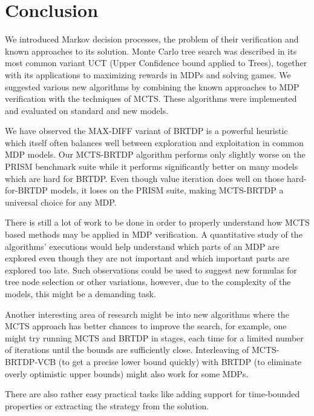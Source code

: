 \chapter{Conclusion}

We introduced Markov decision processes,
the problem of their verification and known approaches to its solution.
Monte Carlo tree search was described in its most common variant UCT
(Upper Confidence bound applied to Trees),
together with its applications to maximizing rewards in MDPs and solving
games.
We suggested various new algorithms by combining the known
approaches to MDP verification with the techniques of MCTS. These
algorithms were implemented and evaluated on standard and new models.

We have observed the MAX-DIFF variant of BRTDP is a powerful
heuristic which itself often balances well between exploration and
exploitation in common MDP models.
Our MCTS-BRTDP algorithm performs only slightly worse on the PRISM
benchmark suite while it performs significantly better on many models
which are hard for BRTDP.  Even though value iteration does well on
those hard-for-BRTDP models, it loses on the PRISM suite, making
MCTS-BRTDP a universal choice for any MDP.

There is still a lot of work to be done in order to properly understand
how MCTS based methods may be applied in MDP verification. A
quantitative study of the algorithms' executions would help understand
which parts
of an MDP are explored even though they are not important and which
important parts are explored too late. Such observations could be used
to suggest new formulas for tree node selection or other variations,
however, due to the complexity of the models, this might be a demanding task.

Another interesting area of research might be into
new algorithms where the MCTS approach has better chances to
improve the search, for example, one might try running MCTS and BRTDP in
stages, each time for a limited number of iterations until the bounds
are sufficiently close. Interleaving of MCTS-BRTDP-VCB (to get a precise
lower bound quickly) with BRTDP (to eliminate overly optimistic upper
bounds) might also work for some MDPs.

There are also rather easy practical tasks like adding support for
time-bounded properties or extracting the strategy from the solution.
